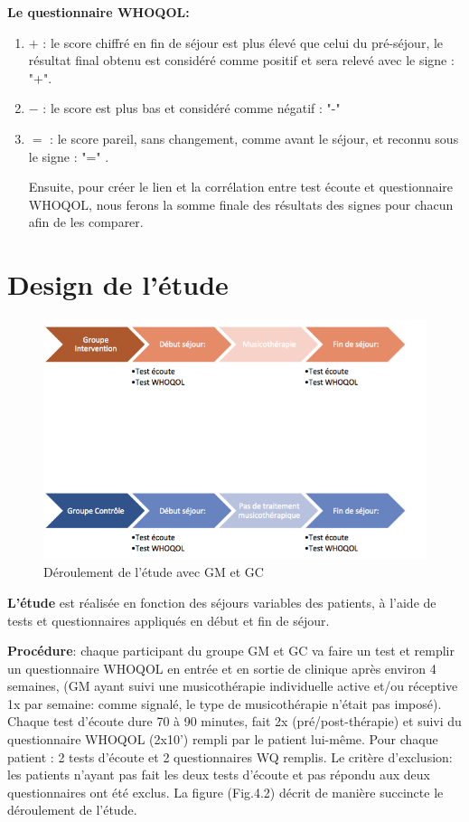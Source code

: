 \textbf{Le questionnaire WHOQOL:} 	
\begin{enumerate}
\item$+$  :  le score chiffré  en fin de séjour est plus élevé
que celui du
pré-séjour, le résultat final obtenu est considéré comme
positif et sera relevé  avec le signe : "+". 
\item $-$ : le score est plus bas et considéré comme négatif : "-"  
\item$=$ : le score pareil, sans changement,  comme avant le séjour, et reconnu sous le signe :  "=" .

Ensuite, pour créer le lien et la corrélation entre test écoute et questionnaire WHOQOL, nous ferons la 
somme finale des résultats des signes pour chacun afin de les comparer.
\end{enumerate}


  \clearpage
\section{Design de l'étude}




\begin{figure}%
	\centering
	\includegraphics[width=1\linewidth]{images/Groupecontrole.png}
	\caption[Schéma du déroulement]{Déroulement de l'étude avec GM et GC}
	
\end{figure}

\textbf{L'étude} est
réalisée en fonction des séjours variables des patients, à l'aide de tests et questionnaires appliqués en 
début
et fin de séjour.

\textbf{Procédure}: chaque participant du groupe GM et GC va faire  un
test et remplir un questionnaire  WHOQOL en entrée et en sortie de
clinique  après environ 4 semaines, (GM ayant suivi une musicothérapie individuelle active et/ou réceptive 
1x par
semaine:  comme signalé, le type de musicothérapie n'était pas imposé).
Chaque test d'écoute dure
70 à 90 minutes, fait 2x (pré/post-thérapie) et
suivi du questionnaire WHOQOL (2x10') rempli par le
patient lui-même.
Pour chaque patient : 2 tests d'écoute et 2 
questionnaires WQ 
remplis. Le critère d'exclusion: les patients n'ayant pas fait les deux tests d'écoute et pas répondu aux 
deux 
questionnaires ont été exclus.
La  figure (Fig.4.2) décrit de manière succincte le déroulement de
l'étude. 

